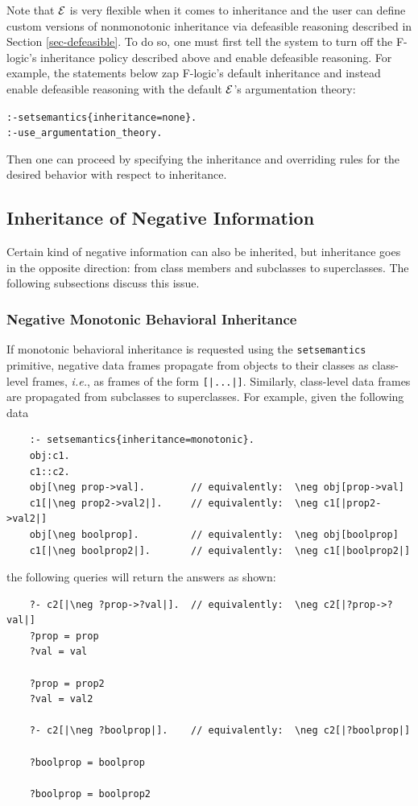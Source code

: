 \documentclass[11pt]{article}
\newcommand{\ERGO}{\mbox{\ensuremath{\cal{E}}\smaller{{\sc{RGO}}}}\xspace}
\newcommand{\FLSYSTEM}{\ERGO}
\begin{document}
Note that \FLSYSTEM is very flexible when it comes to inheritance and the
user can define  custom versions of nonmonotonic inheritance
via defeasible reasoning described in Section \ref{sec-defeasible}.
To do so, one must first tell the system to turn off the F-logic's
inheritance policy described above and enable defeasible reasoning.
For example, the statements below zap F-logic's default inheritance and instead
enable defeasible reasoning with the default \FLSYSTEM's argumentation theory:
\begin{alltt}
  :- setsemantics\{inheritance=none\}.
  :- use\_argumentation\_theory.
\end{alltt}
Then one can proceed by specifying the inheritance and overriding rules
for the desired behavior with respect to inheritance.

\subsection{Inheritance of Negative Information}

Certain kind of negative information can also be inherited, but inheritance
goes in the opposite direction: from class members and subclasses to
superclasses. The following
subsections discuss this issue.

\subsubsection{Negative Monotonic Behavioral Inheritance}

If monotonic behavioral inheritance is requested using the
\texttt{setsemantics} primitive, negative data frames propagate from
objects to their classes as class-level frames, {\it i.e.}, as frames of
the form \texttt{[|...|]}.  Similarly, class-level data frames are
propagated from subclasses to superclasses. For example, given the
following data
\begin{verbatim}
    :- setsemantics{inheritance=monotonic}.
    obj:c1.
    c1::c2.
    obj[\neg prop->val].        // equivalently:  \neg obj[prop->val]
    c1[|\neg prop2->val2|].     // equivalently:  \neg c1[|prop2->val2|]
    obj[\neg boolprop].         // equivalently:  \neg obj[boolprop]
    c1[|\neg boolprop2|].       // equivalently:  \neg c1[|boolprop2|]
\end{verbatim}
the following queries will return the answers as shown:
\begin{verbatim}
    ?- c2[|\neg ?prop->?val|].  // equivalently:  \neg c2[|?prop->?val|]
    ?prop = prop
    ?val = val

    ?prop = prop2
    ?val = val2

    ?- c2[|\neg ?boolprop|].    // equivalently:  \neg c2[|?boolprop|]

    ?boolprop = boolprop

    ?boolprop = boolprop2
\end{verbatim}
\end{document}
